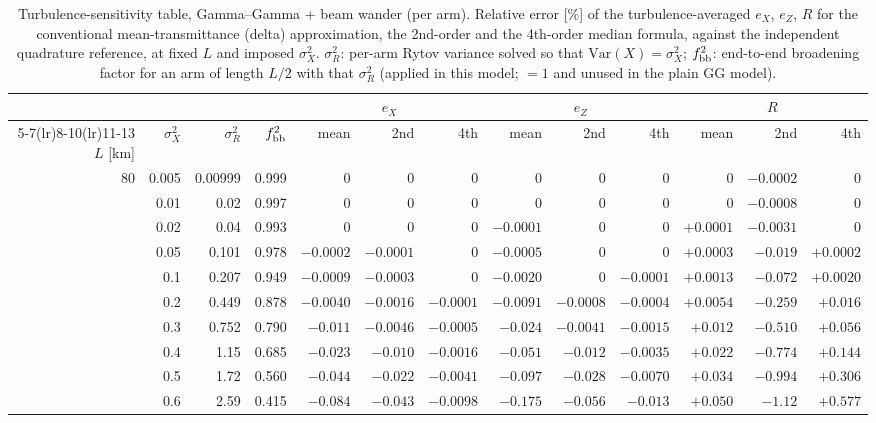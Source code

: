\documentclass[11pt,a4paper]{article}
\begin{document}
\begin{table}[htbp]
\centering\scriptsize
\caption{Turbulence-sensitivity table, Gamma--Gamma + beam wander (per arm). Relative error [\%] of the turbulence-averaged $e_X$, $e_Z$, $R$ for the conventional mean-transmittance (delta) approximation, the 2nd-order and the 4th-order median formula, against the independent quadrature reference, at fixed $L$ and imposed $\sigma_X^2$. $\sigma_R^2$: per-arm Rytov variance solved so that $\mathrm{Var}(X)=\sigma_X^2$; $f_{\rm bb}^2$: end-to-end broadening factor for an arm of length $L/2$ with that $\sigma_R^2$ (applied in this model; $=1$ and unused in the plain GG model).}
\label{tab:sens-GGBB}
\begin{tabular}{rrrrrrrrrrrrr}
\toprule
 & & & & \multicolumn{3}{c}{$e_X$} & \multicolumn{3}{c}{$e_Z$} & \multicolumn{3}{c}{$R$}\\
\cmidrule(lr){5-7}\cmidrule(lr){8-10}\cmidrule(lr){11-13}
$L$ [km] & $\sigma_X^2$ & $\sigma_R^2$ & $f_{\rm bb}^2$ & mean & 2nd & 4th & mean & 2nd & 4th & mean & 2nd & 4th\\
\midrule
80 & 0.005 & 0.00999 & 0.999 & $0$ & $0$ & $0$ & $0$ & $0$ & $0$ & $0$ & $-0.0002$ & $0$ \\
 & 0.01 & 0.02 & 0.997 & $0$ & $0$ & $0$ & $0$ & $0$ & $0$ & $0$ & $-0.0008$ & $0$ \\
 & 0.02 & 0.04 & 0.993 & $0$ & $0$ & $0$ & $-0.0001$ & $0$ & $0$ & $+0.0001$ & $-0.0031$ & $0$ \\
 & 0.05 & 0.101 & 0.978 & $-0.0002$ & $-0.0001$ & $0$ & $-0.0005$ & $0$ & $0$ & $+0.0003$ & $-0.019$ & $+0.0002$ \\
 & 0.1 & 0.207 & 0.949 & $-0.0009$ & $-0.0003$ & $0$ & $-0.0020$ & $0$ & $-0.0001$ & $+0.0013$ & $-0.072$ & $+0.0020$ \\
 & 0.2 & 0.449 & 0.878 & $-0.0040$ & $-0.0016$ & $-0.0001$ & $-0.0091$ & $-0.0008$ & $-0.0004$ & $+0.0054$ & $-0.259$ & $+0.016$ \\
 & 0.3 & 0.752 & 0.790 & $-0.011$ & $-0.0046$ & $-0.0005$ & $-0.024$ & $-0.0041$ & $-0.0015$ & $+0.012$ & $-0.510$ & $+0.056$ \\
 & 0.4 & 1.15 & 0.685 & $-0.023$ & $-0.010$ & $-0.0016$ & $-0.051$ & $-0.012$ & $-0.0035$ & $+0.022$ & $-0.774$ & $+0.144$ \\
 & 0.5 & 1.72 & 0.560 & $-0.044$ & $-0.022$ & $-0.0041$ & $-0.097$ & $-0.028$ & $-0.0070$ & $+0.034$ & $-0.994$ & $+0.306$ \\
 & 0.6 & 2.59 & 0.415 & $-0.084$ & $-0.043$ & $-0.0098$ & $-0.175$ & $-0.056$ & $-0.013$ & $+0.050$ & $-1.12$ & $+0.577$ \\

\end{tabular}
\end{table}
\end{document}

